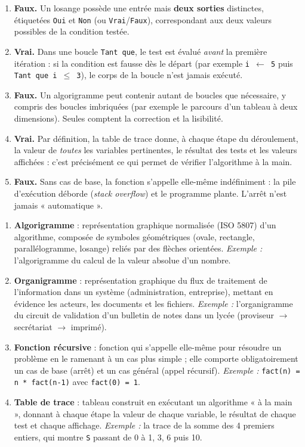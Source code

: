 \documentclass[11pt]{article}
\begin{document}
\begin{corrige}
\begin{enumerate}
\item \textbf{Faux.} Un losange possède une entrée mais \textbf{deux sorties} distinctes, étiquetées \texttt{Oui} et \texttt{Non} (ou \texttt{Vrai}/\texttt{Faux}), correspondant aux deux valeurs possibles de la condition testée.
\item \textbf{Vrai.} Dans une boucle \texttt{Tant que}, le test est évalué \emph{avant} la première itération : si la condition est fausse dès le départ (par exemple \texttt{i $\leftarrow$ 5} puis \texttt{Tant que i $\leq$ 3}), le corps de la boucle n'est jamais exécuté.
\item \textbf{Faux.} Un algorigramme peut contenir autant de boucles que nécessaire, y compris des boucles imbriquées (par exemple le parcours d'un tableau à deux dimensions). Seules comptent la correction et la lisibilité.
\item \textbf{Vrai.} Par définition, la table de trace donne, à chaque étape du déroulement, la valeur de \emph{toutes} les variables pertinentes, le résultat des tests et les valeurs affichées : c'est précisément ce qui permet de vérifier l'algorithme à la main.
\item \textbf{Faux.} Sans cas de base, la fonction s'appelle elle-même indéfiniment : la pile d'exécution déborde (\emph{stack overflow}) et le programme plante. L'arrêt n'est jamais « automatique ».
\end{enumerate}
\end{corrige}

\begin{corrige}
\begin{enumerate}
\item \textbf{Algorigramme} : représentation graphique normalisée (ISO 5807) d'un algorithme, composée de symboles géométriques (ovale, rectangle, parallélogramme, losange) reliés par des flèches orientées. \emph{Exemple :} l'algorigramme du calcul de la valeur absolue d'un nombre.
\item \textbf{Organigramme} : représentation graphique du flux de traitement de l'information dans un système (administration, entreprise), mettant en évidence les acteurs, les documents et les fichiers. \emph{Exemple :} l'organigramme du circuit de validation d'un bulletin de notes dans un lycée (proviseur $\to$ secrétariat $\to$ imprimé).
\item \textbf{Fonction récursive} : fonction qui s'appelle elle-même pour résoudre un problème en le ramenant à un cas plus simple ; elle comporte obligatoirement un cas de base (arrêt) et un cas général (appel récursif). \emph{Exemple :} \texttt{fact(n) = n * fact(n-1)} avec \texttt{fact(0) = 1}.
\item \textbf{Table de trace} : tableau construit en exécutant un algorithme « à la main », donnant à chaque étape la valeur de chaque variable, le résultat de chaque test et chaque affichage. \emph{Exemple :} la trace de la somme des 4 premiers entiers, qui montre \texttt{S} passant de 0 à 1, 3, 6 puis 10.
\end{enumerate}
\end{corrige}
\end{document}
